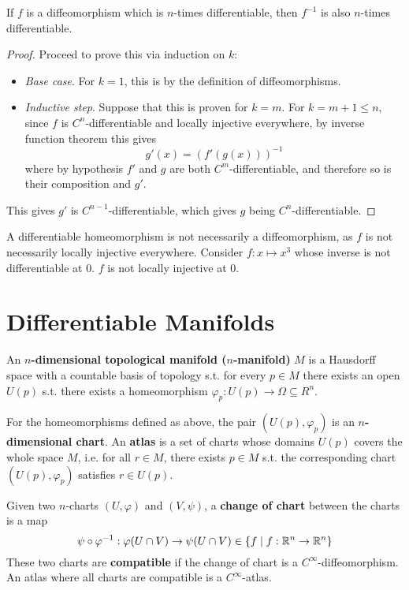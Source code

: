 \documentclass{article}
\begin{document}
\begin{proposition}
    If $f$ is a diffeomorphism which is $n$-times differentiable, then $f^{-1}$ is also $n$-times differentiable.
\end{proposition}

\begin{proof}
    Proceed to prove this via induction on $k$:
    \begin{itemize}
        \item \emph{Base case}. For $k = 1$, this is by the definition of diffeomorphisms.
        \item \emph{Inductive step}. Suppose that this is proven for $k = m$. For $k = m+1 \leq n$, since $f$ is $C^n$-differentiable and locally injective everywhere, by inverse function theorem this gives
        \[
            g'(x) = (f'(g(x)))^{-1}
        \]
        where by hypothesis $f'$ and $g$ are both $C^m$-differentiable, and therefore so is their composition and $g'$.
    \end{itemize}
    This gives $g'$ is $C^{n-1}$-differentiable, which gives $g$ being $C^n$-differentiable.
\end{proof}

\begin{remark}
    A differentiable homeomorphism is not necessarily a diffeomorphism, as $f$ is not necessarily locally injective everywhere. Consider $f: x \mapsto x^3$ whose inverse is not differentiable at $0$. $f$ is not locally injective at 0.  
\end{remark}

\section{Differentiable Manifolds}

\begin{definition}[Manifold]
    An \textbf{$n$-dimensional topological manifold ($n$-manifold)} $M$ is a Hausdorff space with a countable basis of topology s.t. for every $p \in M$ there exists an open $U(p)$ s.t. there exists a homeomorphism $\varphi_p: U(p) \to \Omega \subseteq R^n$.
\end{definition}

\begin{definition}
    For the homeomorphisms defined as above, the pair $(U(p), \varphi_p)$ is an \textbf{$n$-dimensional chart}. An \textbf{atlas} is a set of charts whose domains $U(p)$ covers the whole space $M$, i.e. for all $r \in M$, there exists $p \in M$ s.t. the corresponding chart $(U(p), \varphi_p)$ satisfies $r \in U(p)$. 

    Given two $n$-charts $(U, \varphi)$ and $(V, \psi)$, a \textbf{change of chart} between the charts is a map
    \[
        \psi \circ \varphi^{-1} : \varphi(U \cap V) \to \psi(U \cap V) \in \{f \mid f: \mathbb{R}^n \to \mathbb{R}^n\}
    \]
    These two charts are \textbf{compatible} if the change of chart is a $C^{\infty}$-diffeomorphism. An atlas where all charts are compatible is a $C^{\infty}$-atlas.
\end{definition}
\end{document}
